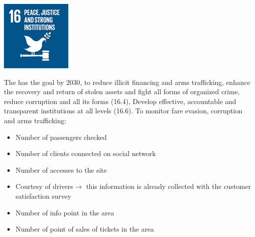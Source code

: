\begin{minipage}[c]{0.2\textwidth}
    \includegraphics[width=\textwidth]{Images/Social_sustainability/16_peace.png}
\end{minipage}
\begin{minipage}[c]{0.8\textwidth}
The has the goal by 2030, to reduce illicit financing and arms trafficking, enhance the recovery and return of stolen assets and fight all forms of organized crime, reduce corruption and all its forms (16.4), Develop effective, accountable and transparent institutions at all levels (16.6).
To monitor fare evasion, corruption and arms trafficking:
\begin{itemize}
    \item	Number of passengers checked
    \item Number of clients connected on social network
    \item Number of accesses to the site
    \item Courtesy of drivers$\rightarrow$ this information is already collected with the customer satisfaction survey
    \item Number of info point in the area 
    \item Number of point of sales of tickets in the area
\end{itemize}
\end{minipage}
